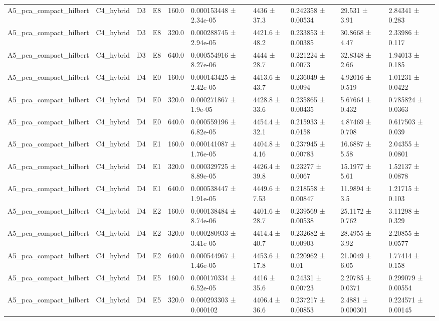 \begin{table}
\begin{tabular}{llllllllll}
A5\_pca\_compact\_hilbert & C4\_hybrid & D3 & E8 & 160.0 & 0.000153448 ± 2.34e-05 & 4436 ± 37.3 & 0.242358 ± 0.00534 & 29.531 ± 3.91 & 2.84341 ± 0.283 \\
A5\_pca\_compact\_hilbert & C4\_hybrid & D3 & E8 & 320.0 & 0.000288745 ± 2.94e-05 & 4421.6 ± 48.2 & 0.233853 ± 0.00385 & 30.8668 ± 4.47 & 2.33986 ± 0.117 \\
A5\_pca\_compact\_hilbert & C4\_hybrid & D3 & E8 & 640.0 & 0.000554916 ± 8.27e-06 & 4444 ± 28.7 & 0.221224 ± 0.0073 & 32.8348 ± 2.66 & 1.94013 ± 0.185 \\
A5\_pca\_compact\_hilbert & C4\_hybrid & D4 & E0 & 160.0 & 0.000143425 ± 2.42e-05 & 4413.6 ± 43.7 & 0.236049 ± 0.0094 & 4.92016 ± 0.519 & 1.01231 ± 0.0422 \\
A5\_pca\_compact\_hilbert & C4\_hybrid & D4 & E0 & 320.0 & 0.000271867 ± 1.9e-05 & 4428.8 ± 33.6 & 0.235865 ± 0.00435 & 5.67664 ± 0.432 & 0.785824 ± 0.0363 \\
A5\_pca\_compact\_hilbert & C4\_hybrid & D4 & E0 & 640.0 & 0.000559196 ± 6.82e-05 & 4454.4 ± 32.1 & 0.215933 ± 0.0158 & 4.87469 ± 0.708 & 0.617503 ± 0.039 \\
A5\_pca\_compact\_hilbert & C4\_hybrid & D4 & E1 & 160.0 & 0.000141087 ± 1.76e-05 & 4404.8 ± 4.16 & 0.237945 ± 0.00783 & 16.6887 ± 5.58 & 2.04355 ± 0.0801 \\
A5\_pca\_compact\_hilbert & C4\_hybrid & D4 & E1 & 320.0 & 0.000329725 ± 8.89e-05 & 4426.4 ± 39.8 & 0.23277 ± 0.0067 & 15.1977 ± 5.61 & 1.52137 ± 0.0878 \\
A5\_pca\_compact\_hilbert & C4\_hybrid & D4 & E1 & 640.0 & 0.000538447 ± 1.91e-05 & 4449.6 ± 7.53 & 0.218558 ± 0.00847 & 11.9894 ± 3.5 & 1.21715 ± 0.103 \\
A5\_pca\_compact\_hilbert & C4\_hybrid & D4 & E2 & 160.0 & 0.000138484 ± 8.74e-06 & 4401.6 ± 28.7 & 0.239569 ± 0.00538 & 25.1172 ± 0.762 & 3.11298 ± 0.329 \\
A5\_pca\_compact\_hilbert & C4\_hybrid & D4 & E2 & 320.0 & 0.000280933 ± 3.41e-05 & 4414.4 ± 40.7 & 0.232682 ± 0.00903 & 28.4955 ± 3.92 & 2.20855 ± 0.0577 \\
A5\_pca\_compact\_hilbert & C4\_hybrid & D4 & E2 & 640.0 & 0.000544967 ± 1.46e-05 & 4453.6 ± 17.8 & 0.220962 ± 0.01 & 21.0049 ± 6.05 & 1.77414 ± 0.158 \\
A5\_pca\_compact\_hilbert & C4\_hybrid & D4 & E5 & 160.0 & 0.000170334 ± 6.52e-05 & 4416 ± 35.6 & 0.24331 ± 0.00723 & 2.20785 ± 0.0371 & 0.299079 ± 0.00554 \\
A5\_pca\_compact\_hilbert & C4\_hybrid & D4 & E5 & 320.0 & 0.000293303 ± 0.000102 & 4406.4 ± 36.6 & 0.237217 ± 0.00853 & 2.4881 ± 0.000301 & 0.224571 ± 0.00145 \\

\end{tabular}
\end{table}

